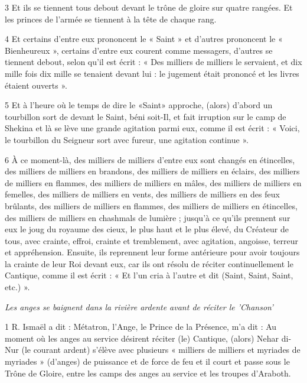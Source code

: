 \par 3 Et ils se tiennent tous debout devant le trône de gloire sur quatre rangées. Et les princes de l'armée se tiennent à la tête de chaque rang.

\par 4 Et certains d'entre eux prononcent le « Saint » et d'autres prononcent le « Bienheureux », certains d'entre eux courent comme messagers, d'autres se tiennent debout, selon qu'il est écrit : « Des milliers de milliers le servaient, et dix mille fois dix mille se tenaient devant lui : le jugement était prononcé et les livres étaient ouverts ».

\par 5 Et à l'heure où le temps de dire le «Saint» approche, (alors) d'abord un tourbillon sort de devant le Saint, béni soit-Il, et fait irruption sur le camp de Shekina et là se lève une grande agitation parmi eux, comme il est écrit : « Voici, le tourbillon du Seigneur sort avec fureur, une agitation continue ».

\par 6 À ce moment-là, des milliers de milliers d'entre eux sont changés en étincelles, des milliers de milliers en brandons, des milliers de milliers en éclairs, des milliers de milliers en flammes, des milliers de milliers en mâles, des milliers de milliers en femelles, des milliers de milliers en vents, des milliers de milliers en des feux brûlants, des milliers de milliers en flammes, des milliers de milliers en étincelles, des milliers de milliers en chashmals de lumière ; jusqu'à ce qu'ils prennent sur eux le joug du royaume des cieux, le plus haut et le plus élevé, du Créateur de tous, avec crainte, effroi, crainte et tremblement, avec agitation, angoisse, terreur et appréhension. Ensuite, ils reprennent leur forme antérieure pour avoir toujours la crainte de leur Roi devant eux, car ils ont résolu de réciter continuellement le Cantique, comme il est écrit : « Et l’un cria à l’autre et dit (Saint, Saint, Saint, etc.) ».



\par \textit{Les anges se baignent dans la rivière ardente avant de réciter le 'Chanson'}

\par 1 R. Ismaël a dit : Métatron, l'Ange, le Prince de la Présence, m'a dit : Au moment où les anges au service désirent réciter (le) Cantique, (alors) Nehar di-Nur (le courant ardent) s'élève avec plusieurs « milliers de milliers et myriades de myriades » (d'anges) de puissance et de force de feu et il court et passe sous le Trône de Gloire, entre les camps des anges au service et les troupes d'Araboth.

